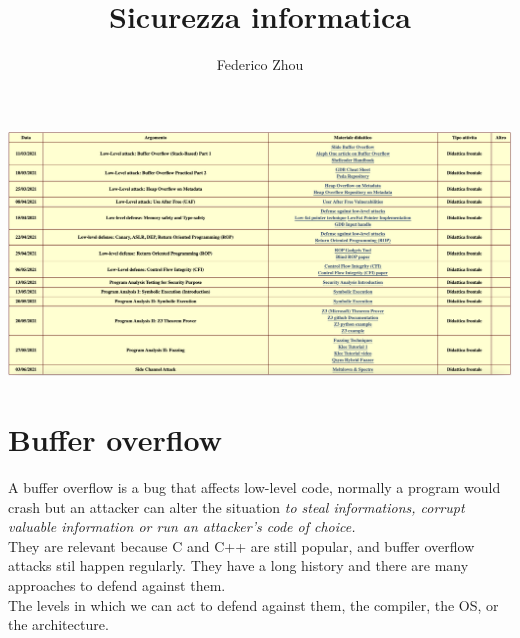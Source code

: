 \documentclass[11pt, oneside]{article}   	%
\title{Sicurezza informatica}
\author{Federico Zhou}
\begin{document}
\maketitle
\includegraphics[scale=0.3]{programma}
\section{Buffer overflow}
A buffer overflow is a bug that affects low-level code, normally a program would crash but an attacker can alter the situation \emph{to steal informations, corrupt valuable information or run an attacker's code of choice.}\\
They are relevant because C and C++ are still popular, and buffer overflow attacks stil happen regularly.
They have a long history and there are many approaches to defend against them.\\
The levels in which we can act to defend against them, the compiler, the OS, or the architecture.
\end{document}
